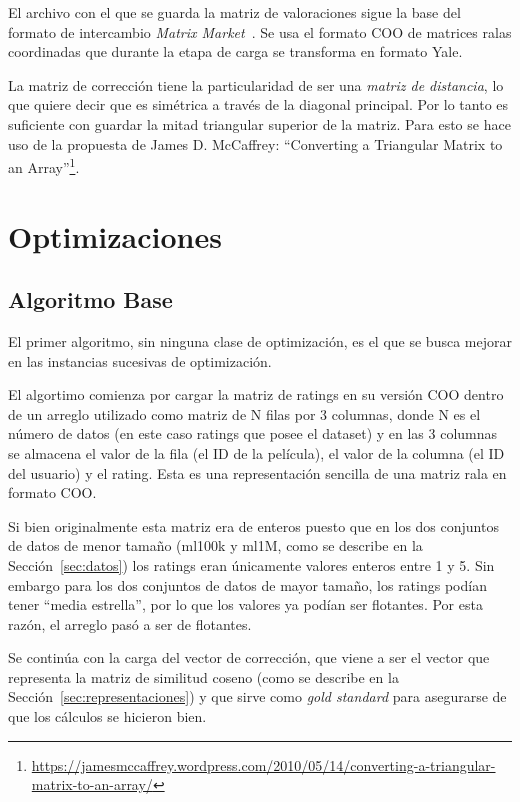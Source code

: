 \documentclass[11pt, a4paper]{article}
\begin{document}
  El archivo con el que se guarda la matriz de valoraciones sigue la base del
  formato de intercambio {\em Matrix Market}~\cite{Boisvert:aa}. Se usa el
  formato COO de matrices ralas coordinadas que durante la etapa de carga se
  transforma en formato Yale. 

  La matriz de corrección tiene la particularidad de ser una {\em matriz de
  distancia}, lo que quiere decir que es simétrica a través de la diagonal
  principal. Por lo tanto es suficiente con guardar la mitad triangular
  superior de la matriz. Para esto se hace uso de la propuesta de James D.
  McCaffrey: ``Converting a Triangular Matrix to an
  Array''\footnote{\url{https://jamesmccaffrey.wordpress.com/2010/05/14/converting-a-triangular-matrix-to-an-array/}}.

  \section{Optimizaciones}\label{sec:optimizaciones}

  \subsection{Algoritmo Base}

  El primer algoritmo, sin ninguna clase de optimización, es el que se busca
  mejorar en las instancias sucesivas de optimización.

  El algortimo comienza por cargar la matriz de ratings en su versión COO
  dentro de un arreglo utilizado como matriz de N filas por 3 columnas, donde N
  es el número de datos (en este caso ratings que posee el dataset) y en las 3
  columnas se almacena el valor de la fila (el ID de la película), el valor de
  la columna (el ID del usuario) y el rating. Esta es una representación
  sencilla de una matriz rala en formato COO.

  Si bien originalmente esta matriz era de enteros puesto que en los dos
  conjuntos de datos de menor tamaño (ml100k y ml1M, como se describe en la
  Sección~\ref{sec:datos}) los ratings eran únicamente valores enteros entre 1 y
  5. Sin embargo para los dos conjuntos de datos de mayor tamaño, los ratings
  podían tener ``media estrella'', por lo que los valores ya podían ser
  flotantes. Por esta razón, el arreglo pasó a ser de flotantes. 

  Se continúa con la carga del vector de corrección, que viene a ser el vector
  que representa la matriz de similitud coseno (como se describe en la
  Sección~\ref{sec:representaciones}) y que sirve como {\em gold standard} para
  asegurarse de que los cálculos se hicieron bien.
\end{document}
